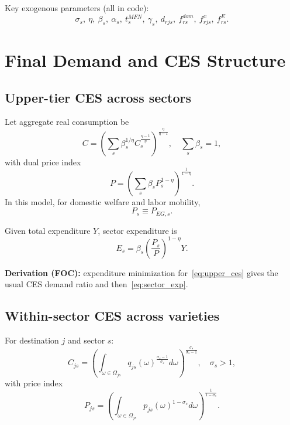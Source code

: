 \documentclass[11pt]{article}
\begin{document}
Key exogenous parameters (all in code):
\[
\sigma_s,\ \eta,\ \beta_s,\ \alpha_s,\ t^{MFN}_s,\ \gamma_s,\ d_{rjs},\ f^{dom}_{rs},\ f^x_{rjs},\ f^E_{rs}.
\]

\section{Final Demand and CES Structure}
\subsection{Upper-tier CES across sectors}
Let aggregate real consumption be
\begin{equation}
C = \left(\sum_{s} \beta_s^{1/\eta} C_s^{\frac{\eta-1}{\eta}}\right)^{\frac{\eta}{\eta-1}},
\quad \sum_s \beta_s = 1,
\label{eq:upper_ces}
\end{equation}
with dual price index
\begin{equation}
P = \left(\sum_s \beta_s P_s^{1-\eta}\right)^{\frac{1}{1-\eta}}.
\label{eq:upper_price}
\end{equation}
In this model, for domestic welfare and labor mobility,
\begin{equation}
P_s \equiv P_{EG,s}.
\label{eq:Ps_equals_PEGs}
\end{equation}

Given total expenditure $Y$, sector expenditure is
\begin{equation}
E_s = \beta_s \left(\frac{P_s}{P}\right)^{1-\eta} Y.
\label{eq:sector_exp}
\end{equation}

\textbf{Derivation (FOC):} expenditure minimization for~\eqref{eq:upper_ces} gives the usual CES demand ratio and then~\eqref{eq:sector_exp}.

\subsection{Within-sector CES across varieties}
For destination $j$ and sector $s$:
\begin{equation}
C_{js} = \left(\int_{\omega \in \Omega_{js}} q_{js}(\omega)^{\frac{\sigma_s-1}{\sigma_s}} d\omega\right)^{\frac{\sigma_s}{\sigma_s-1}},
\quad \sigma_s > 1,
\end{equation}
with price index
\begin{equation}
P_{js} = \left(\int_{\omega \in \Omega_{js}} p_{js}(\omega)^{1-\sigma_s} d\omega\right)^{\frac{1}{1-\sigma_s}}.
\end{equation}
\end{document}
